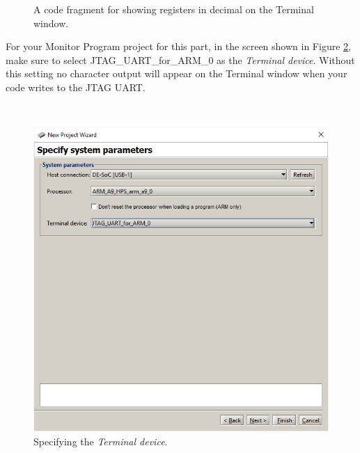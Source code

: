 \documentclass[epsfig,10pt,fullpage]{article}
\newcommand{\CommonDocsPath}{../../../../common/docs}
\begin{document}
\begin{figure}[H]
\begin{center}
\begin{minipage}[t]{16.5 cm}

\end{minipage}
\end{center}
\caption{A code fragment for showing registers in decimal on the Terminal window.}
\label{fig:codefrag}
\end{figure}

\newpage
\noindent
For your Monitor Program project for this part, in the screen shown in Figure
\ref{fig:terminal}, make sure to select {\sf JTAG\_UART\_for\_ARM\_0} as the {\it Terminal
device}. Without this setting no character output will appear on the Terminal window when 
your code writes to the JTAG UART.

~\\
\begin{figure}[htb]
	\begin{center}
	\includegraphics[scale=0.58]{figures/terminal.png}
	\end{center}
	\vspace{-0.25cm}\caption{Specifying the {\it Terminal device}.}
\label{fig:terminal}
\end{figure}



\end{document}

